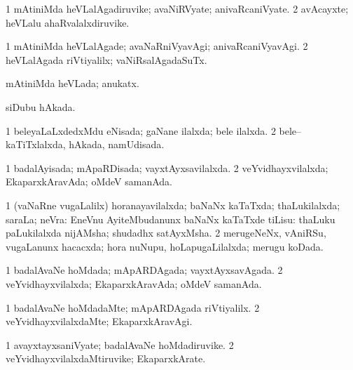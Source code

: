 \bentry
{} 
\gl{\nA}
\expl{}
\bmng
\bnum
\num{1} mAtiniMda heVLalAgadiruvike; avaNiRVyate; anivaRcaniVyate. 
\num{2} avAcayxte; heVLalu ahaRvalalxdiruvike. 
\enum
\emng
\eentry

\bentry
{} 
\gl{\kirxvi}
\expl{}
\bmng
\bnum
\num{1} mAtiniMda heVLalAgade; avaNaRniVyavAgi; anivaRcaniVyavAgi. 
\num{2} heVLalAgada riVtiyalilx; vaNiRsalAgadaSuTx. 
\enum
\emng
\eentry

\bentry
{} 
\gl{\gu}
\expl{}
\bmng
mAtiniMda heVLada; anukatx. 
\emng
\eentry

\bentry
{} 
\gl{\gu}
\expl{}
\bmng
siDubu hAkada. 
\emng
\eentry

\bentry
{} 
\gl{\gu}
\expl{}
\bmng
\bnum
\num{1} beleyaLaLxdedxMdu eNisada; gaNane ilalxda; bele ilalxda. 
\num{2} bele-- kaTiTxlalxda, hAkada, namUdisada. 
\enum
\emng
\eentry

\bentry
{} 
\gl{\gu}
\expl{}
\bmng
\bnum
\num{1} badalAyisada; mApaRDisada; vayxtAyxsavilalxda. 
\num{2} veYvidhayxvilalxda; EkaparxkAravAda; oMdeV samanAda. 
\enum
\emng
\eentry

\bentry
{} 
\gl{\gu}
\expl{}
\bmng
\bnum
\num{1} (vaNaRne \mo vugaLalilx) horanayavilalxda; baNaNx kaTaTxda; thaLukilalxda; saraLa; neVra:  EneVnu AyiteMbudanunx baNaNx kaTaTxde tiLisu:  thaLuku paLukilalxda nijAMsha; shudadhx satAyxMsha. 
\num{2} merugeNeNx, vAniRSu, \mo vugaLanunx hacacxda; hora nuNupu, hoLapugaLilalxda; merugu koDada. 
\enum
\emng
\eentry

\bentry
{} 
\gl{\gu}
\expl{}
\bmng
\bnum
\num{1} badalAvaNe hoMdada; mApARDAgada; vayxtAyxsavAgada. 
\num{2} veYvidhayxvilalxda; EkaparxkAravAda; oMdeV samanAda. 
\enum
\emng
\eentry

\bentry
{} 
\gl{\kirxvi}
\expl{}
\bmng
\bnum
\num{1} badalAvaNe hoMdadaMte; mApARDAgada riVtiyalilx. 
\num{2} veYvidhayxvilalxdaMte; EkaparxkAravAgi. 
\enum
\emng
\eentry

\bentry
{} 
\gl{\nA}
\expl{}
\bmng
\bnum
\num{1} avayxtayxsaniVyate; badalAvaNe hoMdadiruvike. 
\num{2} veYvidhayxvilalxdaMtiruvike; EkaparxkArate. 
\enum
\emng
\eentry

